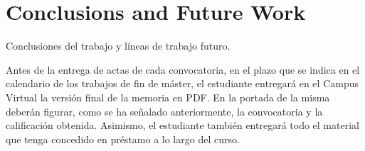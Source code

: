 \chapter{Conclusions and Future Work}
\label{cap:conclusiones}


Conclusiones del trabajo y líneas de trabajo futuro.

Antes de la entrega de actas de cada convocatoria, en el plazo que se indica en el calendario de los trabajos de fin de máster, el estudiante entregará en el Campus Virtual la versión final de la memoria en PDF. En la portada de la misma deberán figurar, como se ha señalado anteriormente, la convocatoria y la calificación obtenida. Asimismo, el estudiante también entregará todo el material que tenga concedido en préstamo a lo largo del curso.


